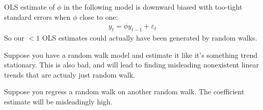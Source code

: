 \documentclass[12pt]{article}
\theoremstyle{plain}
\theoremstyle{definition}
\theoremstyle{remark}
\newcommand{\Var}{\operatorname{Var}}
\begin{document}
OLS estimate of $\phi$ in the following model is downward biased
with too-tight standard errors when $\phi$ close to one:
\begin{align*}
  y_t = \phi y_{t-1} + \varepsilon_t
\end{align*}
So our $<1$ OLS estimates could actually have been generated by random
walks.

Suppose you have a random walk model and estimate it like it's something
trend stationary. This is also bad, and will lead to finding misleading
nonexistent linear trends that are actualy just random walk.

Suppose you regress a random walk on another random walk. The
coefficient estimate will be misleadingly high.







\end{document}
